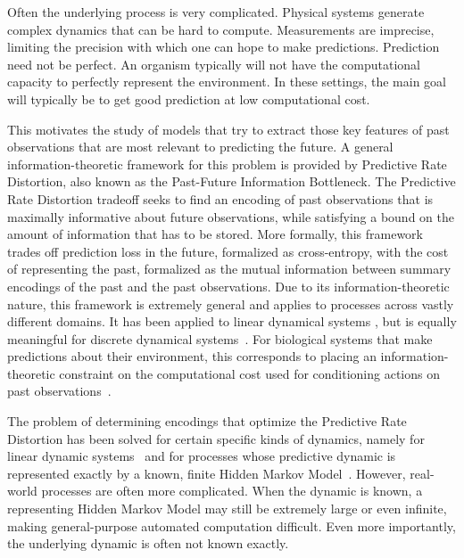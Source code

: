 \documentclass[11pt,letterpaper]{article}
\begin{document}
Often the underlying process is very complicated.
Physical systems generate complex dynamics that can be hard to compute.
Measurements are imprecise, limiting the precision with which one can hope to make predictions.
Prediction need not be perfect.
An organism typically will not have the computational capacity to perfectly represent the environment.
In these settings, the main goal will typically be to get good prediction at low computational cost.



This motivates the study of models that try to extract those key features of past observations that are most relevant to predicting the future.
A general information-theoretic framework for this problem is provided by Predictive Rate Distortion, also known as the Past-Future Information Bottleneck.
The Predictive Rate Distortion tradeoff seeks to find an encoding of past observations that is maximally informative about future observations, while satisfying a bound on the amount of information that has to be stored.
More formally, this framework trades off prediction loss in the future, formalized as cross-entropy, with the cost of representing the past, formalized as the mutual information between summary encodings of the past and the past observations.
Due to its information-theoretic nature, this framework is extremely general and applies to processes across vastly different domains.
It has been applied to linear dynamical systems \citep{creutzig-past-future-2009,amir2015past}, but is equally meaningful for discrete dynamical systems~\citep{marzen-predictive-2016}.
For biological systems that make predictions about their environment, this corresponds to placing an information-theoretic constraint on the computational cost used for conditioning actions on past observations~\citep{genewein2015bounded}.

The problem of determining encodings that optimize the Predictive Rate Distortion has been solved for certain specific kinds of dynamics, namely for linear dynamic systems~\citep{creutzig-past-future-2009} and for processes whose predictive dynamic is represented exactly by a known, finite Hidden Markov Model~\citep{marzen-predictive-2016}.
However, real-world processes are often more complicated.
When the dynamic is known, a representing Hidden Markov Model may still be extremely large or even infinite, making general-purpose automated computation difficult.
Even more importantly, the underlying dynamic is often not known exactly.
\end{document}
